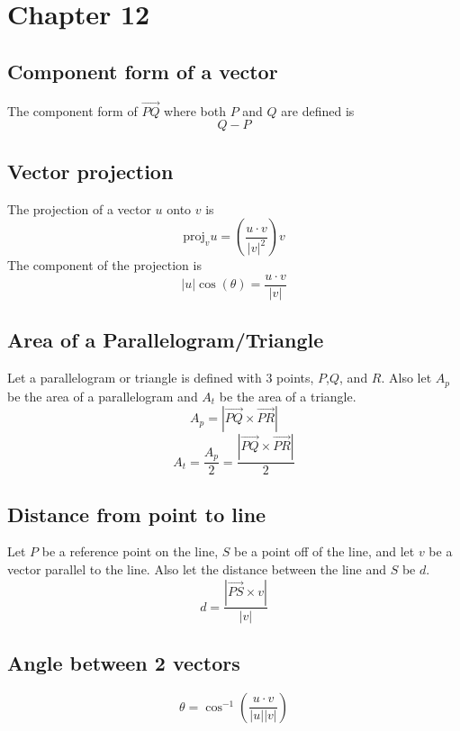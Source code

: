 \documentclass[../main.tex]{subfiles}
\begin{document}
\section{Chapter 12}

\subsection{Component form of a vector}
The component form of $\vec{PQ}$ where both $P$ and $Q$ are defined is 
\begin{equation*}
	Q-P
\end{equation*}

\subsection{Vector projection}
The projection of a vector $u$ onto $v$ is 
\begin{equation*}
	\text{proj}_v u = \left( \frac{u \cdot v}{|v|^2} \right)v
\end{equation*}
The component of the projection is 
\begin{equation*}
	|u|\cos(\theta) = \frac{u \cdot v}{|v|}
\end{equation*}

\subsection{Area of a Parallelogram/Triangle}
Let a parallelogram or triangle is defined with 3 points, $P$,$Q$, and $R$.
Also let $A_p$ be the area of a parallelogram and $A_t$ be the area of a triangle.
\begin{equation*}
	A_p = | \vec{PQ} \times \vec{PR} |
\end{equation*}
\begin{equation*}
	A_t = \frac{A_p}{2} = \frac{|\vec{PQ} \times \vec{PR}|}{2}
\end{equation*}

\subsection{Distance from point to line}
Let $P$ be a reference point on the line, $S$ be a point off of the line, and let $v$ be a vector 
parallel to the line.
Also let the distance between the line and $S$ be $d$.
\begin{equation*}
	d = \frac{|\vec{PS} \times v|}{|v|}
\end{equation*}

\subsection{Angle between 2 vectors}
\begin{equation*}
	\theta = \cos^{-1} \left( \frac{u \cdot v}{|u||v|} \right)
\end{equation*}
\end{document}
